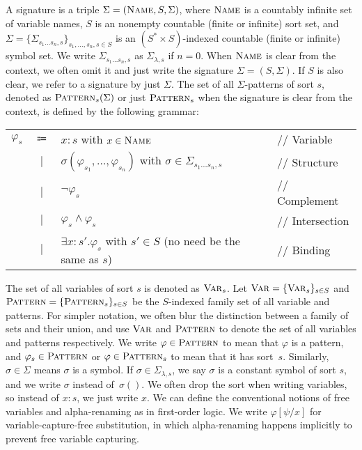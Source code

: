 \documentclass[letter,12pt]{article}
\newcommand{\Name}{\textnormal{\textsc{Name}}}
\newcommand{\Var}{\textnormal{\textsc{Var}}}
\newcommand{\sig}{{\Sigma}}
\newcommand{\Pattern}{\textnormal{\textsc{Pattern}}}
\newcommand{\ddd}{,\dots,}
\newcommand{\cln}{\mathbin{\!:\!}}
\newcommand{\doubleslash}{//\xspace}
\newcommand{\SigmaSub}[1]{\Sigma_{#1}}
\begin{document}
A signature is a triple
$\sig = (\Name, S, \Sigma)$,
where
$\Name$ is
a countably infinite set of variable names,
$S$ is an nonempty countable (finite or infinite) sort set,
and $\Sigma = \{ \SigmaSub{s_1 \dots s_n ,s} \}_{s_1 \ddd s_n , s \in S}$
is an $(S^* \times S)$-indexed countable (finite or infinite) symbol set.
We write $\SigmaSub{s_1 \dots s_n , s}$ as
$\SigmaSub{\lambda , s}$ if $n = 0$.
When $\Name$ is clear from the context,
we often omit it and just write the signature $\sig = (S, \Sigma)$.
If $S$ is also clear, we refer to a signature
by just $\Sigma$.
The set of all $\sig$-patterns of sort $s$,
denoted as $\Pattern_s(\sig)$ or just $\Pattern_s$ when the signature is clear
from the context,
is defined by the following grammar:
\begin{center}
\begin{tabular}{rcll}
$\varphi_s$
& $\Coloneqq$
& $x \cln s$
  with $x \in \Name$
& \doubleslash Variable
\\
& $|$
& $\sigma(\varphi_{s_1} \ddd \varphi_{s_n})$
  with $\sigma \in \SigmaSub{s_1 \dots s_n , s}$
& \doubleslash Structure
\\
& $|$
& $\neg \varphi_s$
& \doubleslash Complement
\\
& $|$
& $\varphi_s \wedge \varphi_s$
& \doubleslash Intersection
\\
& $|$
& $\exists x \cln s'. \varphi_s$
  with $s' \in S$ (no need be the same as $s$)
& \doubleslash Binding
\end{tabular}
\end{center}
The set of all variables of sort $s$ is denoted as $\Var_s$.
Let $\Var = \{ \Var_s \}_{s \in S}$ and $\Pattern = \{ \Pattern_s \}_{s \in S}$
be the $S$-indexed family set of all variable and patterns.
For simpler notation,
we often blur the distinction between
a family of sets and their union,
and use $\Var$ and $\Pattern$
to denote the set of all variables and patterns respectively.
We write
$\varphi \in \Pattern$ to mean that $\varphi$ is a pattern,
and $\varphi_s \in \Pattern$ or $\varphi \in \Pattern_s$ to mean that
it has sort~$s$.
Similarly, $\sigma \in \Sigma$ means $\sigma$ is a symbol.
If $\sigma \in \SigmaSub{\lambda, s}$, we say $\sigma$
is a constant symbol of sort $s$, and
we write $\sigma$ instead of~$\sigma()$.
We often drop the sort when writing variables, 
so instead of $x \cln s$, we just write $x$.
We can define the conventional notions of free variables and
alpha-renaming as in first-order logic.
We write $\varphi [\psi/x]$ for variable-capture-free substitution,
in which alpha-renaming happens implicitly to prevent
free variable capturing.
\end{document}
